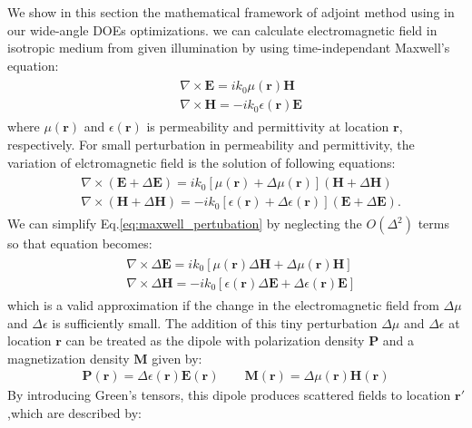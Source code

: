 We show in this section the mathematical framework of adjoint method using in our wide-angle DOEs optimizations.
we can calculate electromagnetic field in isotropic medium from given illumination by using time-independant Maxwell's equation:
\begin{align}\label{eq:maxwell}
\begin{split}
&\nabla \times \bm{E} = i k_0 \mu(\bm{r})\bm{H} \\
&\nabla \times \bm{H} = - i k_0 \epsilon(\bm{r})\bm{E}
\end{split}
\end{align}
where $\mu(\bm{r})$ and $\epsilon(\bm{r})$
is  permeability and permittivity at location $\bm{r}$, respectively.
For small perturbation in permeability and permittivity, the variation of elctromagnetic field is the solution of following equations:
\begin{align}\label{eq:maxwell_pertubation}
\begin{split}
&\nabla \times \left( \bm{E} + \Delta\bm{E} \right) = i k_0 \left[\mu(\bm{r})+\Delta\mu(\bm{r})\right]\left( \bm{H} + \Delta\bm{H} \right) \\
&\nabla \times \left( \bm{H} + \Delta\bm{H} \right) = -i k_0 \left[\epsilon(\bm{r})+\Delta\epsilon(\bm{r})\right]\left(\bm{E} + \Delta\bm{E} \right) .
\end{split}
\end{align}
We can simplify Eq.\ref{eq:maxwell_pertubation} by neglecting the $O(\Delta ^2)$ terms so that equation becomes:
\begin{align}\label{eq:maxwell_pertubation2}
\begin{split}
&\nabla \times \Delta\bm{E} = i k_0 \left[\mu(\bm{r})\Delta\bm{H}+\Delta\mu(\bm{r})\bm{H}\right] \\
&\nabla \times \Delta\bm{H} = -i k_0 \left[\epsilon(\bm{r})\Delta\bm{E}+\Delta\epsilon(\bm{r})\bm{E}\right]
\end{split}
\end{align}
which is a valid approximation if the change in the electromagnetic field from $\Delta \mu$ and $\Delta \epsilon$ is sufficiently small.
The addition of this tiny perturbation $\Delta \mu$ and $\Delta \epsilon$ at location $\bm{r}$ can be treated as the dipole with polarization density $\bm{P}$ and a magnetization density $\bm{M}$ given by:
\begin{align}\label{eq:dipole}
\bm{P(r)}=\Delta\epsilon(\bm{r})\bm{E(r)} \qquad \bm{M(r)}=\Delta\mu(\bm{r})\bm{H(r)}
\end{align}
By introducing Green's tensors, this dipole produces scattered fields to location $\bm{r'}$ ,which are described by:
